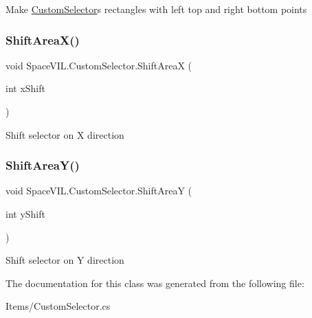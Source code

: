 Make \mbox{\hyperlink{class_space_v_i_l_1_1_custom_selector}{Custom\+Selector}}\textquotesingle{}s rectangles with left top and right bottom points 

\mbox{\label{class_space_v_i_l_1_1_custom_selector_a08f268e6bae2b8b270b068a5a2754d0f}} 
\subsubsection{\texorpdfstring{Shift\+Area\+X()}{ShiftAreaX()}}
{\footnotesize\ttfamily void Space\+V\+I\+L.\+Custom\+Selector.\+Shift\+AreaX (\begin{DoxyParamCaption}\item[{int}]{x\+Shift }\end{DoxyParamCaption})\hspace{0.3cm}{\ttfamily [inline]}}



Shift selector on X direction 

\mbox{\label{class_space_v_i_l_1_1_custom_selector_a15a5e74c4b53829cd7018a15929c9aeb}} 
\subsubsection{\texorpdfstring{Shift\+Area\+Y()}{ShiftAreaY()}}
{\footnotesize\ttfamily void Space\+V\+I\+L.\+Custom\+Selector.\+Shift\+AreaY (\begin{DoxyParamCaption}\item[{int}]{y\+Shift }\end{DoxyParamCaption})\hspace{0.3cm}{\ttfamily [inline]}}



Shift selector on Y direction 



The documentation for this class was generated from the following file\+:\begin{DoxyCompactItemize}
\item 
Items/Custom\+Selector.\+cs\end{DoxyCompactItemize}
